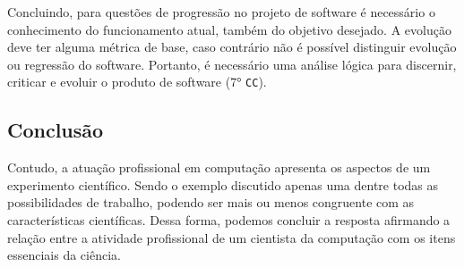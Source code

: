\begin{itemize}
    Concluindo, para questões de progressão no projeto de software é necessário o conhecimento do funcionamento atual, também do objetivo desejado. A evolução deve ter alguma métrica de base, caso contrário não é possível distinguir evolução ou regressão do software. Portanto, é necessário uma análise lógica para discernir, criticar e evoluir o produto de software (7° \texttt{CC}).
    

\subsection{Conclusão}
 Contudo, a atuação profissional em computação apresenta os aspectos de um experimento científico. Sendo o exemplo discutido apenas uma dentre todas as possibilidades de trabalho, podendo ser mais ou menos congruente com as características científicas. Dessa forma, podemos concluir a resposta afirmando a relação entre a atividade profissional de um cientista da computação com os itens essenciais da ciência.
 
 
\end{itemize}


